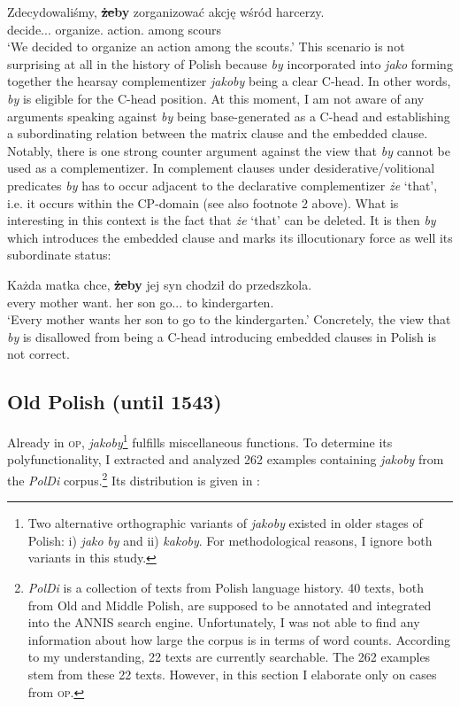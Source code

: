 \documentclass[output=paper
,modfonts
,nonflat]{langsci/langscibook}
\begin{document}
{\ea \gll Zdecydowaliśmy, \textbf{\sout{że}by} zorganizować akcję wśród harcerzy. \\
		decide.{\lptcp}.{\vir}.{\firstperson}{\pl} {\comp} organize.{\infv} action.{\acc} among scours \\
\glt	 `We decided to organize an action among the scouts.'
\z
This scenario is not surprising at all in the history of Polish because \emph{by} incorporated into \emph{jako} forming together the hearsay complementizer \emph{jakoby} being a clear C-head. In other words, \emph{by} is eligible for the C-head position. At this moment, I am not aware of any arguments speaking against \emph{by} being base-generated as a C-head and establishing a subordinating relation between the matrix clause and the embedded clause. Notably, there is one strong counter argument against the view that \emph{by} cannot be used as a complementizer. In complement clauses under desiderative\slash volitional predicates \emph{by} has to occur adjacent to the declarative complementizer \emph{że} `that', i.e. it occurs within the CP-domain (see also footnote 2 above).  What is interesting in this context is the fact that \emph{że} `that' can be deleted. It is then \emph{by} which introduces the embedded clause and marks its illocutionary force as well its subordinate status:

\ea \gll Każda matka chce, {\textbf{\sout{że}by}} jej syn chodził do przedszkola. \\
		every mother want.{\thirdperson}{\sg} {\comp} her son go.{\lptcp}.{\sg}.{\masc} to kindergarten.{\gen} \\
\glt	`Every mother wants her son to go to the kindergarten.'
\z
Concretely, the view that \emph{by} is disallowed from being a C-head introducing embedded clauses in Polish is not correct.
}

\subsection{Old Polish (until 1543)}

Already in \textsc{op}, \emph{jakoby}\footnote{Two alternative orthographic variants of \emph{jakoby} existed in older stages of Polish: i) \emph{jako} \emph{by} and ii) \emph{kakoby}. For methodological reasons, I ignore both variants in this study.
}
 fulfills miscellaneous functions. To determine its polyfunctionality, I extracted and analyzed 262 examples containing \emph{jakoby} from the \emph{PolDi} corpus.\footnote{\emph{PolDi} is a collection of texts from Polish language history. 40 texts, both from Old and Middle Polish, are supposed to be annotated and integrated into the ANNIS search engine. Unfortunately, I was not able to find any information about how large the corpus is in terms of word counts. According to my understanding, 22 texts are currently searchable. The 262 examples stem from these 22 texts. However, in this section I elaborate only on cases from \textsc{op}.

}
Its distribution is given in :
\end{document}

